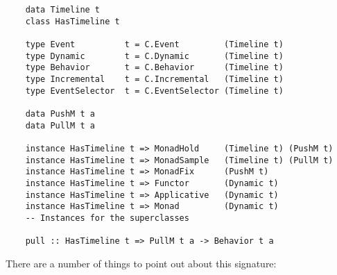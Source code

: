 \begin{lstlisting}
    data Timeline t
    class HasTimeline t

    type Event          t = C.Event         (Timeline t)
    type Dynamic        t = C.Dynamic       (Timeline t)
    type Behavior       t = C.Behavior      (Timeline t)
    type Incremental    t = C.Incremental   (Timeline t)
    type EventSelector  t = C.EventSelector (Timeline t)

    data PushM t a
    data PullM t a

    instance HasTimeline t => MonadHold     (Timeline t) (PushM t)
    instance HasTimeline t => MonadSample   (Timeline t) (PullM t)
    instance HasTimeline t => MonadFix      (PushM t)
    instance HasTimeline t => Functor       (Dynamic t)
    instance HasTimeline t => Applicative   (Dynamic t)
    instance HasTimeline t => Monad         (Dynamic t)
    -- Instances for the superclasses

    pull :: HasTimeline t => PullM t a -> Behavior t a
\end{lstlisting}
%
There are a number of things to point out about this signature:

